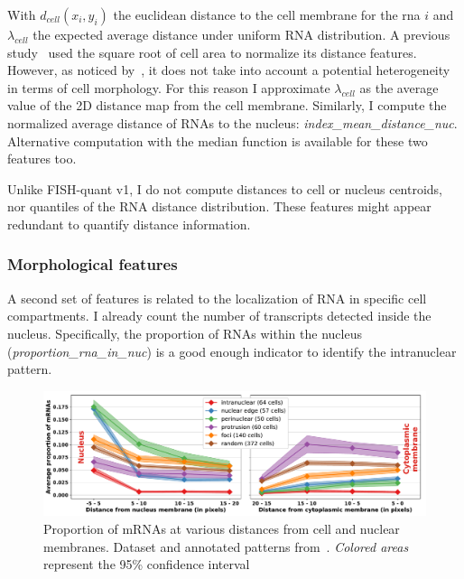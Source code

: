 \noindent
With $d_{cell}(x_i, y_i)$ the euclidean distance to the cell membrane for the rna $i$ and $\lambda_{cell}$ the expected average distance under uniform \ac{RNA} distribution.
A previous study~\cite{battich_control_2015} used the square root of cell area to normalize its distance features.
However, as noticed by~\cite{samacoits_computational_2018}, it does not take into account a potential heterogeneity in terms of cell morphology.
For this reason I approximate $\lambda_{cell}$ as the average value of the 2D distance map from the cell membrane.
Similarly, I compute the normalized average distance of \ac{RNA}s to the nucleus: \emph{index\_mean\_distance\_nuc}.
Alternative computation with the median function is available for these two features too.

Unlike FISH-quant v1, I do not compute distances to cell or nucleus centroids, nor quantiles of the \ac{RNA} distance distribution.
These features might appear redundant to quantify distance information.

\subsubsection{Morphological features}

A second set of features is related to the localization of \ac{RNA} in specific cell compartments.
I already count the number of transcripts detected inside the nucleus.
Specifically, the proportion of \ac{RNA}s within the nucleus (\emph{proportion\_rna\_in\_nuc}) is a good enough indicator to identify the intranuclear pattern.

\begin{figure}[]
    \centering
    \includegraphics[width=\textwidth]{figures/chapter4/plot_topography}
    \caption[Proportion of mRNAs in several subcellular regions]{Proportion of mRNAs at various distances from cell and nuclear membranes.
	Dataset and annotated patterns from~\cite{CHOUAIB_2020}.
	\textit{Colored areas} represent the 95\% confidence interval}
    \label{fig:features_topography}
\end{figure}

